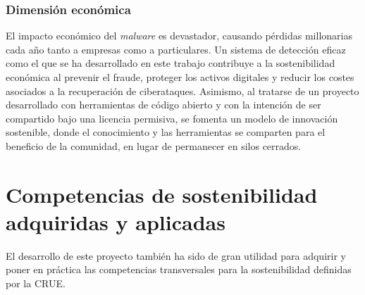 \subsubsection{Dimensión económica}
El impacto económico del \textit{malware} es devastador, causando pérdidas millonarias cada año tanto a empresas como a particulares. Un sistema de detección eficaz como el que se ha desarrollado en este trabajo contribuye a la sostenibilidad económica al prevenir el fraude, proteger los activos digitales y reducir los costes asociados a la recuperación de ciberataques. Asimismo, al tratarse de un proyecto desarrollado con herramientas de código abierto y con la intención de ser compartido bajo una licencia permisiva, se fomenta un modelo de innovación sostenible, donde el conocimiento y las herramientas se comparten para el beneficio de la comunidad, en lugar de permanecer en silos cerrados.

\section{Competencias de sostenibilidad adquiridas y aplicadas}

El desarrollo de este proyecto también ha sido de gran utilidad para adquirir y poner en práctica las competencias transversales para la sostenibilidad definidas por la CRUE.

